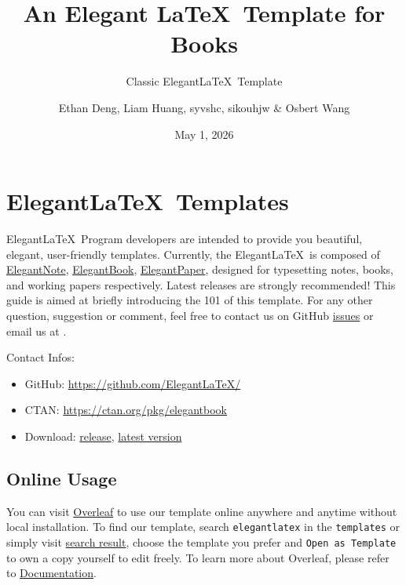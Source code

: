 \documentclass[11pt]{elegantbook}
\title{An Elegant \LaTeX\ Template for Books}
\subtitle{Classic Elegant\LaTeX\ Template}
\author{Ethan Deng, Liam Huang, syvshc, sikouhjw \& Osbert Wang}
\institute{Elegant\LaTeX\ Program}
\date{May 1, 2026}
\begin{document}
\maketitle

\frontmatter
\tableofcontents

\mainmatter

\chapter{Elegant\LaTeX\ Templates}
Elegant\LaTeX\ Program developers are intended to provide you beautiful, elegant, user-friendly templates. Currently, the Elegant\LaTeX\ is composed of \href{https://github.com/ElegantLaTeX/ElegantNote}{ElegantNote}, \href{https://github.com/ElegantLaTeX/ElegantBook}{ElegantBook}, \href{https://github.com/ElegantLaTeX/ElegantPaper}{ElegantPaper}, designed for typesetting notes, books, and working papers respectively. Latest releases are strongly recommended! This guide is aimed at briefly introducing the 101 of this template. For any other question, suggestion or comment, feel free to contact us on GitHub \href{https://github.com/ElegantLaTeX/ElegantBook/issues}{issues} or email us at .

Contact Infos:
\begin{itemize}
  \item GitHub: \href{https://github.com/ElegantLaTeX/}{https://github.com/ElegantLaTeX/}
  \item CTAN: \href{https://ctan.org/pkg/elegantbook}{https://ctan.org/pkg/elegantbook}
  \item Download: \href{https://github.com/ElegantLaTeX/ElegantBook/releases}{release}, \href{https://github.com/ElegantLaTeX/ElegantBook/archive/master.zip}{latest version}
\end{itemize}


\section{Online Usage}
You can visit \href{https://www.overleaf.com/}{Overleaf} to use our template online anywhere and anytime without local installation. To find our template, search \lstinline{elegantlatex} in the \lstinline{templates} or simply visit \href{https://www.overleaf.com/latex/templates?addsearch=elegantlatex}{search result}, choose the template you prefer and \lstinline{Open as Template} to own a copy yourself to edit freely. To learn more about Overleaf, please refer to \href{https://www.overleaf.com/learn}{Documentation}.
\end{document}
